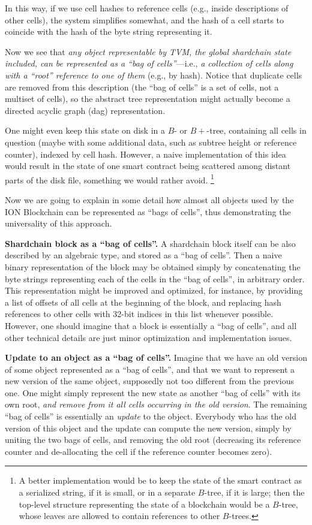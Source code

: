 \documentclass[12pt,oneside]{article}
\def\makepoint#1{\medbreak\noindent{\bf #1.\ }}
\def\nxsubpoint{\refstepcounter{subsubsection}%
  \smallbreak\makepoint{\thesubsubsection}}
\def\embt(#1.){\textbf{#1.}}
\begin{document}
In this way, if we use cell hashes to reference cells (e.g., inside
descriptions of other cells), the system simplifies somewhat, and the
hash of a cell starts to coincide with the hash of the byte string
representing it.

Now we see that {\em any object representable by TVM, the global
  shardchain state included, can be represented as a ``bag of
  cells''}---i.e., {\em a collection of cells along with a ``root''
  reference to one of them\/} (e.g., by hash). Notice that duplicate
cells are removed from this description (the ``bag of cells'' is a set
of cells, not a multiset of cells), so the abstract tree
representation might actually become a directed acyclic graph (dag)
representation.

One might even keep this state on disk in a $B$- or $B+$-tree,
containing all cells in question (maybe with some additional data,
such as subtree height or reference counter), indexed by cell
hash. However, a naive implementation of this idea would result in the
state of one smart contract being scattered among distant parts of the
disk file, something we would rather avoid.%
\footnote{A better implementation would be to keep the state of the
  smart contract as a serialized string, if it is small, or in a
  separate $B$-tree, if it is large; then the top-level structure
  representing the state of a blockchain would be a $B$-tree, whose
  leaves are allowed to contain references to other $B$-trees.}

Now we are going to explain in some detail how almost all objects used
by the ION Blockchain can be represented as ``bags of cells'', thus
demonstrating the universality of this approach.

\nxsubpoint \embt(Shardchain block as a ``bag of cells''.)  A
shardchain block itself can be also described by an algebraic type,
and stored as a ``bag of cells''. Then a naive binary representation
of the block may be obtained simply by concatenating the byte strings
representing each of the cells in the ``bag of cells'', in arbitrary
order. This representation might be improved and optimized, for
instance, by providing a list of offsets of all cells at the beginning
of the block, and replacing hash references to other cells with 32-bit
indices in this list whenever possible. However, one should imagine
that a block is essentially a ``bag of cells'', and all other
technical details are just minor optimization and implementation
issues.

\nxsubpoint\label{sp:obj.update} \embt(Update to an object as a ``bag
of cells''.)  Imagine that we have an old version of some object
represented as a ``bag of cells'', and that we want to represent a new
version of the same object, supposedly not too different from the
previous one. One might simply represent the new state as another
``bag of cells'' with its own root, {\em and remove from it all cells
  occurring in the old version}. The remaining ``bag of cells'' is
essentially an {\em update\/} to the object. Everybody who has the old
version of this object and the update can compute the new version,
simply by uniting the two bags of cells, and removing the old root
(decreasing its reference counter and de-allocating the cell if the
reference counter becomes zero).
\end{document}
